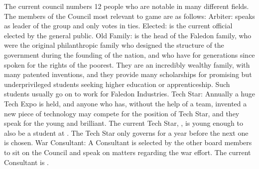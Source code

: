 \documentclass[blue]{GL2020}
\begin{document}
The current council numbers 12 people who are notable in many different fields. The members of the Council most relevant to game are as follows:
		Arbiter:		\cArbiter{} speaks as leader of the group and only votes in ties.
		Elected:	\cElected{} is the current official elected by the general public. 
		Old Family:	\cFaledonParent{} is the head of the Faledon family, who were the original philanthropic family who designed the structure of the government during the founding of the nation, and who have for generations since spoken for the rights of the poorest. They are an incredibly wealthy family, with many patented inventions, and they provide many scholarships for promising but underprivileged students seeking higher education or apprenticeship. Such students usually go on to work for Faledon Industries.
		Tech Star: Annually a huge Tech Expo is held, and anyone who has, without the help of a team, invented a new piece of technology may compete for the position of Tech Star, and they speak for the young and brilliant. The current Tech Star, \cTechStar{}, is young enough to also be a student at \pSchool{}. The Tech Star only governs for a year before the next one is chosen.
		War Consultant: A Consultant is selected by the other board members to sit on the Council and speak on matters regarding the war effort.  The current Consultant is \cWar{}.
\end{document}
